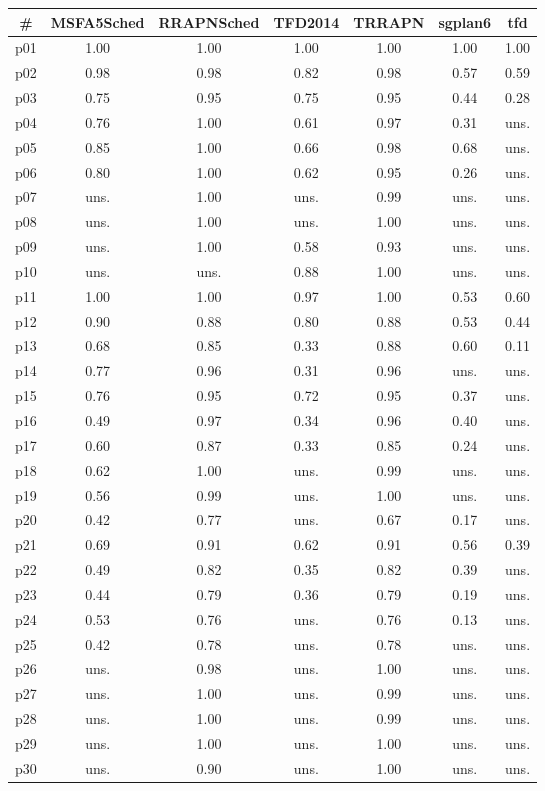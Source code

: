 \begin{tabular}{ccccccc}
\toprule
\textbf{\#} & \textbf{MSFA5Sched} & \textbf{RRAPNSched} & \textbf{TFD2014} & \textbf{TRRAPN} & \textbf{sgplan6} & \textbf{tfd}\\
\midrule
p01 & 1.00 & 1.00 & 1.00 & 1.00 & 1.00 & 1.00\\
p02 & 0.98 & 0.98 & 0.82 & 0.98 & 0.57 & 0.59\\
p03 & 0.75 & 0.95 & 0.75 & 0.95 & 0.44 & 0.28\\
p04 & 0.76 & 1.00 & 0.61 & 0.97 & 0.31 & uns.\\
p05 & 0.85 & 1.00 & 0.66 & 0.98 & 0.68 & uns.\\
p06 & 0.80 & 1.00 & 0.62 & 0.95 & 0.26 & uns.\\
p07 & uns. & 1.00 & uns. & 0.99 & uns. & uns.\\
p08 & uns. & 1.00 & uns. & 1.00 & uns. & uns.\\
p09 & uns. & 1.00 & 0.58 & 0.93 & uns. & uns.\\
p10 & uns. & uns. & 0.88 & 1.00 & uns. & uns.\\
p11 & 1.00 & 1.00 & 0.97 & 1.00 & 0.53 & 0.60\\
p12 & 0.90 & 0.88 & 0.80 & 0.88 & 0.53 & 0.44\\
p13 & 0.68 & 0.85 & 0.33 & 0.88 & 0.60 & 0.11\\
p14 & 0.77 & 0.96 & 0.31 & 0.96 & uns. & uns.\\
p15 & 0.76 & 0.95 & 0.72 & 0.95 & 0.37 & uns.\\
p16 & 0.49 & 0.97 & 0.34 & 0.96 & 0.40 & uns.\\
p17 & 0.60 & 0.87 & 0.33 & 0.85 & 0.24 & uns.\\
p18 & 0.62 & 1.00 & uns. & 0.99 & uns. & uns.\\
p19 & 0.56 & 0.99 & uns. & 1.00 & uns. & uns.\\
p20 & 0.42 & 0.77 & uns. & 0.67 & 0.17 & uns.\\
p21 & 0.69 & 0.91 & 0.62 & 0.91 & 0.56 & 0.39\\
p22 & 0.49 & 0.82 & 0.35 & 0.82 & 0.39 & uns.\\
p23 & 0.44 & 0.79 & 0.36 & 0.79 & 0.19 & uns.\\
p24 & 0.53 & 0.76 & uns. & 0.76 & 0.13 & uns.\\
p25 & 0.42 & 0.78 & uns. & 0.78 & uns. & uns.\\
p26 & uns. & 0.98 & uns. & 1.00 & uns. & uns.\\
p27 & uns. & 1.00 & uns. & 0.99 & uns. & uns.\\
p28 & uns. & 1.00 & uns. & 0.99 & uns. & uns.\\
p29 & uns. & 1.00 & uns. & 1.00 & uns. & uns.\\
p30 & uns. & 0.90 & uns. & 1.00 & uns. & uns.\\
\bottomrule
\end{tabular}

